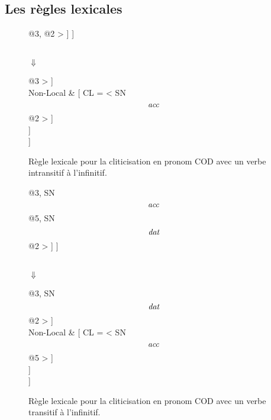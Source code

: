 \subsection{Les règles lexicales}

\begin{figure}[ht]
\centering
\begin{avm}
  [{}
    phon         & </\emph{fait}/> \\
    synsem = Cat & [{} Sous-cat = < SN @{1}, V[{}
						TRANS & -\\
						Sous-cat & < SN @{2}> $\oplus$ @{4} ] @{3}, @{2} >
					      ]
  ]
\end{avm}\\
$\Downarrow$\\
\begin{avm}
  [{}
    phon   & </\emph{le-fait}/> \\
    synsem & [{}
	      Local = Cat & [{} Sous-cat = < SN @{1}, V [{}
						          TRANS    & -\\
							  Sous-cat & @{4}
							] @{3} > ]\\
	      Non-Local   & [{} CL = < SN\[\emph{acc}\] @{2} > ]\\
             ]\\
  ]
\end{avm}
\caption{Règle lexicale pour la cliticisation en pronom COD avec un verbe intransitif à l'infinitif.\label{regle.cl.cod}}
\end{figure}

\begin{figure}[ht]
\centering
\begin{avm}
  [{}
    phon         & </\emph{fait}/> \\
    synsem = Cat & [{} Sous-cat = < SN @{1}, V[{}
						TRANS & +\\
						Sous-cat & < SN @{2}, SN\[\emph{acc}\] @{5}> $\oplus$ @{4} ] @{3}, SN\[\emph{acc}\] @{5}, SN\[\emph{dat}\] @{2} >
					      ]
  ]
\end{avm}\\
$\Downarrow$\\
\begin{avm}
  [{}
    phon   & </\emph{le-fait}/> \\
    synsem & [{}
	      Local = Cat & [{} Sous-cat = < SN @{1}, V [{}
						          TRANS    & +\\
							  Sous-cat & < SN\[\emph{acc}\] @{5} > $\oplus$ @{4}
							] @{3}, SN\[\emph{dat}\] @{2} > ]\\
	      Non-Local   & [{} CL = < SN\[\emph{acc}\] @{5} > ]\\
             ]\\
  ]
\end{avm}
\caption{Règle lexicale pour la cliticisation en pronom COD avec un verbe transitif à l'infinitif.\label{regle.cl.cod.trans}}
\end{figure}

